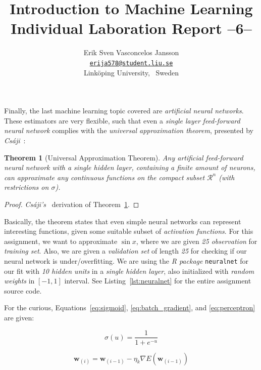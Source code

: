 \documentclass[a4paper, twocolumn]{article}
\title{Introduction to Machine Learning \\
       Individual Laboration Report --6--}
\author{{Erik Sven Vasconcelos Jansson} \\
        {\href{mailto:erija578@student.liu.se}
        {\texttt{erija578@student.liu.se}}} \\
        {Linköping University, \, Sweden}}
\newtheorem{theorem}{Theorem}
\begin{document}
    \maketitle %

    Finally, the last machine learning topic covered are \emph{artificial neural networks}. These estimators are very flexible, such that even a \emph{single layer} \emph{feed-forward neural network} complies with the \emph{universal approximation theorem}, presented by \emph{Cs\'aji}~\cite{csaji2001approximation}:

    \begin{theorem}[Universal Approximation Theorem] \label{thm:uat}
        Any artificial feed-forward neural network with a single hidden layer, containing a finite amount of neurons, can approximate any continuous functions on the compact subset $\mathcal{R}^n$ (with restrictions on $\sigma$).
    \end{theorem}

    \begin{proof}
        \emph{Cs\'aji's}~\cite{csaji2001approximation} derivation of Theorem~\ref{thm:uat}.
    \end{proof}

    Basically, the theorem states that even simple neural networks can represent interesting functions, given some suitable subset of \emph{activation functions}. For this assignment, we want to approximate $\sin x$, where we are given \emph{25 observation} for \emph{training set}. Also, we are given a \emph{validation set} of length \emph{25} for checking if our neural network is under/overfitting. We are using the \emph{R package} \verb|neuralnet| for our fit with \emph{10 hidden units} in a \emph{single hidden layer}, also initialized with \emph{random weights} in $[-1, 1]$ interval. See Listing~\ref{lst:neuralnet} for the entire assignment source code.

    For the curious, Equations~\ref{eq:sigmoid}, \ref{eq:batch_gradient}, and \ref{eq:perceptron} are given:

    \begin{equation} \label{eq:sigmoid}
        \sigma(u) = \frac{1}{1 + e^{-u}}
    \end{equation}

    \begin{equation} \label{eq:batch_gradient}
        \bm{w}_{(i)} = \bm{w}_{(i-1)} - \eta_k \nabla E(\bm{w}_{(i-1)})
    \end{equation}
\end{document}

